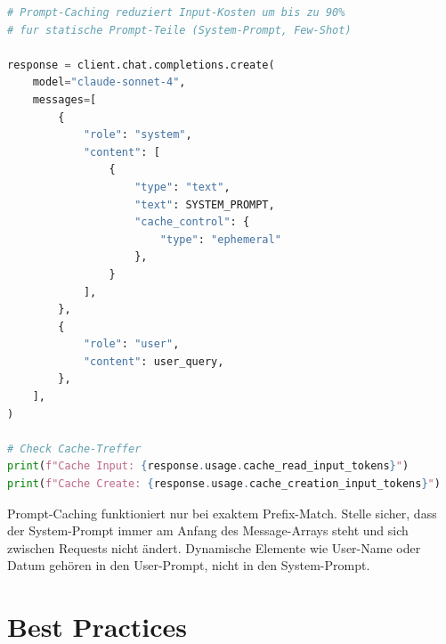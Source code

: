 \begin{lstlisting}[language=Python, caption={Prompt-Caching mit Cache-Control}, label=lst:prompt-caching]
# Prompt-Caching reduziert Input-Kosten um bis zu 90%
# fur statische Prompt-Teile (System-Prompt, Few-Shot)

response = client.chat.completions.create(
    model="claude-sonnet-4",
    messages=[
        {
            "role": "system",
            "content": [
                {
                    "type": "text",
                    "text": SYSTEM_PROMPT,
                    "cache_control": {
                        "type": "ephemeral"
                    },
                }
            ],
        },
        {
            "role": "user",
            "content": user_query,
        },
    ],
)

# Check Cache-Treffer
print(f"Cache Input: {response.usage.cache_read_input_tokens}")
print(f"Cache Create: {response.usage.cache_creation_input_tokens}")
\end{lstlisting}

\begin{praxishinweis}
Prompt-Caching funktioniert nur bei exaktem Prefix-Match. Stelle sicher, dass der System-Prompt immer am Anfang des Message-Arrays steht und sich zwischen Requests nicht ändert. Dynamische Elemente wie User-Name oder Datum gehören in den User-Prompt, nicht in den System-Prompt.
\end{praxishinweis}

\section{Best Practices}

